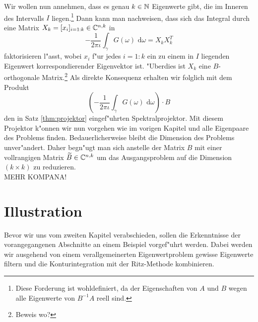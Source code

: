 Wir wollen nun annehmen, dass es genau $k\in\mathbb{N}$ Eigenwerte gibt,
die im Inneren des Intervalls $I$ liegen.\footnote{Diese Forderung ist wohldefiniert, da
der Eigenschaften von $A$ und $B$ wegen alle Eigenwerte von $B^{-1}A$ reell sind.}
Dann kann man nachweisen, dass sich das Integral durch eine Matrix
$X_k = [x_i]_{i=1:k}\in\mathbb{C}^{n,k}$ in
\[
-\frac{1}{2\pi\iota}\int_\gamma G(\omega)\text{ d}\omega = X_k X_k^T
\]
faktorisieren l"asst, wobei $x_i$ f"ur jedes $i=1:k$ ein zu einem in $I$ liegenden
Eigenwert korrespondierender Eigenvektor ist. "Uberdies ist $X_k$ eine $B$-orthogonale Matrix.\footnote{Beweis wo?}
Als direkte Konsequenz erhalten wir folglich mit dem Produkt
\[
\left( -\frac{1}{2\pi\iota}\int_\gamma G(\omega)\text{ d}\omega \right) \cdot B
\]
den in Satz \ref{thm:projektor} eingef"uhrten Spektralprojektor. Mit diesem Projektor
k"onnen wir nun vorgehen wie im vorigen Kapitel und alle Eigenpaare des Problems
finden. Bedauerlicherweise bleibt die Dimension des Problems unver"andert. Daher
begn"ugt man sich anstelle der Matrix $B$ mit einer vollrangigen Matrix $\widetilde{B}\in\mathbb{C}^{n,k}$
um das Ausgangsproblem auf die Dimension $(k\times k)$ zu reduzieren.\\

MEHR KOMPANA!
\newpage
\section{Illustration}\label{sec:bsp}

Bevor wir uns vom zweiten Kapitel verabschieden, sollen die Erkenntnisse der vorangegangenen
Abschnitte an einem Beispiel vorgef"uhrt werden. Dabei werden wir ausgehend von einem
verallgemeinerten Eigenwertproblem gewisse Eigenwerte filtern und die Konturintegration
mit der Ritz-Methode kombinieren.\\

